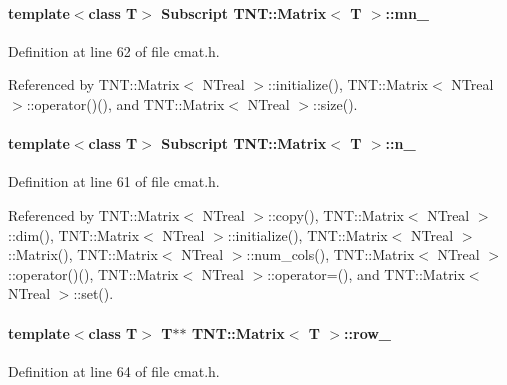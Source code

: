 \paragraph[{mn\_\-}]{\setlength{\rightskip}{0pt plus 5cm}template$<$class T$>$ {\bf Subscript} {\bf TNT::Matrix}$<$ T $>$::{\bf mn\_\-}}\hfill\label{class_t_n_t_1_1_matrix_a1211bb821e4b22be124e16b1123f769c}


Definition at line 62 of file cmat.h.



Referenced by TNT::Matrix$<$ NTreal $>$::initialize(), TNT::Matrix$<$ NTreal $>$::operator()(), and TNT::Matrix$<$ NTreal $>$::size().

\paragraph[{n\_\-}]{\setlength{\rightskip}{0pt plus 5cm}template$<$class T$>$ {\bf Subscript} {\bf TNT::Matrix}$<$ T $>$::{\bf n\_\-}}\hfill\label{class_t_n_t_1_1_matrix_ab7dc73d05542cc97be2280a50ac1374c}


Definition at line 61 of file cmat.h.



Referenced by TNT::Matrix$<$ NTreal $>$::copy(), TNT::Matrix$<$ NTreal $>$::dim(), TNT::Matrix$<$ NTreal $>$::initialize(), TNT::Matrix$<$ NTreal $>$::Matrix(), TNT::Matrix$<$ NTreal $>$::num\_\-cols(), TNT::Matrix$<$ NTreal $>$::operator()(), TNT::Matrix$<$ NTreal $>$::operator=(), and TNT::Matrix$<$ NTreal $>$::set().

\paragraph[{row\_\-}]{\setlength{\rightskip}{0pt plus 5cm}template$<$class T$>$ T$\ast$$\ast$ {\bf TNT::Matrix}$<$ T $>$::{\bf row\_\-}}\hfill\label{class_t_n_t_1_1_matrix_a9b970ee02290aa814d67ca6e8a4ebc60}


Definition at line 64 of file cmat.h.



